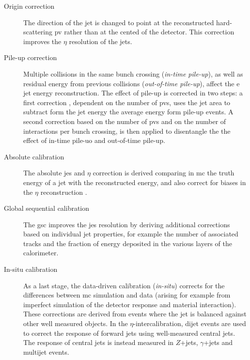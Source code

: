 \begin{description}
\item[Origin correction] The direction of the jet is changed to point at the reconstructed hard-scattering \gls{pv} rather than at the cented of the detector. This correction improves the $\eta$ resolution of the jets.

\item[Pile-up correction] Multiple collisions in the same bunch crossing (\textit{in-time pile-up}), as well as residual energy from previous collisions (\textit{out-of-time pile-up}), affect the e jet energy reconstruction. The effect of pile-up is corrected in two steps: a first correction \cite{Cacciari:2007fd,TheATLAScollaboration:2013pia}, dependent on the number of \glspl{pv}, uses the jet area to subtract form the jet energy the average energy form pile-up events. A second correction based on the number of \glspl{pv} and on the number of interactions per bunch crossing, is then applied to disentangle the the effect of in-time pile-uo and out-of-time pile-up.

\item[Absolute calibration] The absolute \gls{jes} and $\eta$ correction is derived comparing in \gls{mc} the truth energy of a jet with the reconstructed energy, and also correct for biases in the $\eta$ reconstruction \cite{Aad2015jets}.

\item[Global sequential calibration] The \gls{gsc} \cite{ATLAS:2015oia} improves the \gls{jes} resolution by deriving additional corrections based on individual jet properties, for example the number of associated tracks and the fraction of energy deposited in the various layers of the calorimeter.

\item[In-situ calibration] As a last stage, the data-driven calibration (\textit{in-situ}) \cite{ATLAS:2015uwa} corrects for the differences between \gls{mc} simulation and data (arising for example from imperfect simulation of the detector response and material interaction). These corrections are derived from events where the jet \pt is balanced against other well measured objects. In the $\eta$-intercalibration, dijet events are used to correct the response of forward jets using well-measured central jets. The response of central jets is instead measured in $Z$+jets, $\gamma$+jets and multijet events. 
 
\end{description}

